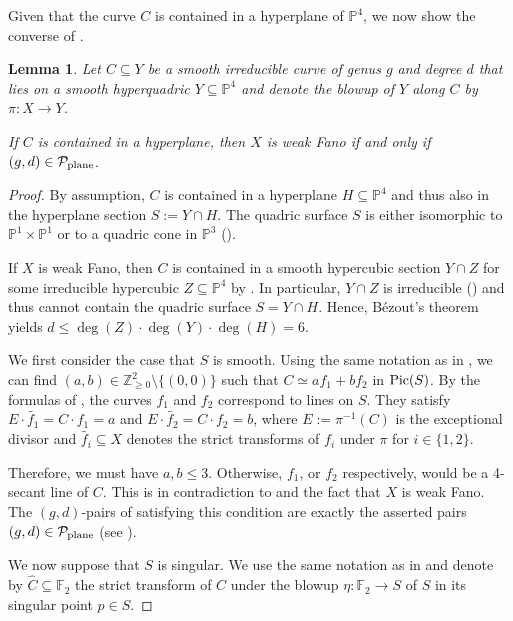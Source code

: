 \documentclass[english,11pt,reqno]{amsart}
\newcommand{\sub}{\subseteq}
\newcommand{\Pthree}{\mathbb{P}^3}
\newcommand{\Pfour}{\mathbb{P}^4}
\newcommand{\PxP}{\mathbb{P}^1 \times \mathbb{P}^1}
\newcommand{\Z}{\mathbb{Z}}
\newcommand{\Pic}{\textup{Pic}}
\newcommand{\Ftwo}{\mathbb{F}_2}
\newtheorem{lem}[thm]{Lemma}
\begin{document}
%
%
Given that the curve $C$ is contained in a hyperplane of $\Pfour$, we now show the converse of .
%
%
%
\begin{lem} \label{lem:weak_Fano_hyperplane_weak_Fano_implies_in_list}
Let $C \sub Y$ be a smooth irreducible curve of genus $g$ and degree $d$ that lies on a smooth hyperquadric $Y \sub \Pfour$ and denote the blowup of $Y$ along $C$ by $\pi:X\rightarrow Y$. \par
If $C$ is contained in a hyperplane, then $X$ is weak Fano if and only if $ (g,d) \in \mathcal{P}_{\textup{plane}}$.
\end{lem}
%
%
%
\begin{proof}
By assumption, $C$ is contained in a hyperplane $H\sub \Pfour$ and thus also in the hyperplane section $S:=Y \cap H$. The quadric surface $S$ is either isomorphic to $\PxP$ or to a quadric cone in $\Pthree$ ().\par
%
If $X$ is weak Fano, then $C$ is contained in a smooth hypercubic section $Y\cap Z$ for some irreducible hypercubic $Z\sub \Pfour$ by . In particular, $Y \cap Z$ is irreducible () and thus cannot contain the quadric surface $S=Y\cap H$. Hence, Bézout's theorem yields $d\leq \deg(Z)\cdot \deg(Y)\cdot \deg(H)=6$.\par
%
We first consider the case that $S$ is smooth. Using the same notation as in , we can find $(a,b)\in \Z^2_{\geq 0} \setminus\{(0,0)\}$ such that $C\simeq af_1+bf_2$ in $\Pic(S)$. By the formulas of , the curves $f_1$ and $f_2$ correspond to lines on $S$. They satisfy $E\cdot \widetilde{f_1}=C\cdot f_1 = a$ and $E\cdot \widetilde{f_2}=C \cdot f_2 = b$, where $E:=\pi^{-1}(C)$ is the exceptional divisor and $\widetilde{f_i}\sub X$ denotes the strict transforms of $f_i$ under $\pi$ for $i\in\{1,2\}$. \par 
Therefore, we must have $a,b\leq 3$. Otherwise, $f_1$, or $f_2$ respectively, would be a 4-secant line of $C$. This is in contradiction to  and the fact that $X$ is weak Fano. The $(g,d)$-pairs of  satisfying this condition are exactly the asserted pairs $(g,d)\in\mathcal{P}_{\textup{plane}}$ (see ). \par
%
We now suppose that $S$ is singular. We use the same notation as in  and denote by $\hat{C}\sub \Ftwo$ the strict transform of $C$ under the blowup $\eta:\Ftwo \rightarrow S$ of $S$ in its singular point $p\in S$.

\end{proof}
\end{document}

